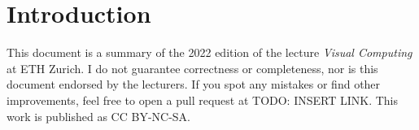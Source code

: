 \section{Introduction}

This document is a summary of the 2022 edition of the lecture \textit{Visual Computing} at ETH Zurich. I do not guarantee correctness or completeness, nor is this document endorsed by the lecturers. If you spot any mistakes or find other improvements, feel free to open a pull request at TODO: INSERT LINK. This work is published as CC BY-NC-SA.
\begin{center}
	\ccbyncsa
\end{center}